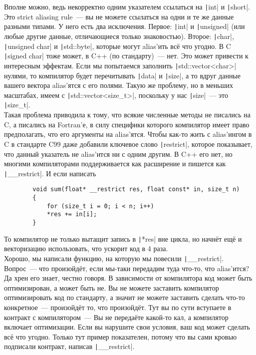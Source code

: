 \documentclass{article}
\begin{document}
    Вполне можно, ведь некорректно одним указателем ссылаться на \texttt|int| и \texttt|short|. Это strict aliasing rule~--- вы не можете ссылаться на одни и те же данные разными типами. У него есть два исключения. Первое: \texttt|int| и \texttt|unsigned| (или любые другие данные, отличающиеся только знаковостью). Второе: \texttt|char|, \texttt|unsigned char| и \texttt|std::byte|, которые могут alias'ить всё что угодно. В C \texttt|signed char| тоже может, в C++ (по стандарту)~--- нет. Это может привести к интересным эффектам. Если мы попытаемся заполнить \texttt|std::vector<char>| нулями, то компилятор будет перечитывать \texttt|data| и \texttt|size|, а то вдруг данные вашего вектора alias'ятся с его полями. Такую же проблему, но в меньших масштабах, имеем с \texttt|std::vector<size_t>|, поскольку у нас \texttt|size|~--- это \texttt|size_t|.\\
    Такая проблема приводила к тому, что всякие численные методы не писались на C, а писались на Fortran'е, в силу специфики которого компилятор имеет право предполагать, что его аргументы на alias'ятся. Чтобы как-то жить с alias'ингом в C в стандарте C99 даже добавили ключевое слово \texttt|restrict|, которое показывает, что данный указатель не alias'ится ни с одним другим. В C++ его нет, но многими компиляторами поддерживается как расширение и пишется как \texttt|__restrict|. И если написать
    \begin{verbatim}
        void sum(float* __restrict res, float const* in, size_t n)
        {
            for (size_t i = 0; i < n; i++)
            *res += in[i];
        }
    \end{verbatim}
    То компилятор не только вытащит запись в \texttt|*res| вне цикла, но начнёт ещё и векторизацию использовать, что ускорит код в 4 раза.\\
    Хорошо, мы написали функцию, на которую мы повесили \texttt|__restrict|. Вопрос~--- что произойдёт, если мы-таки передадим туда что-то, что alias'ится? Да хрен его знает, честно говоря. В зависимости от компилятора код может быть оптимизирован, а может быть не. Вы не можете заставить компилятор оптимизировать код по стандарту, а значит не можете заставить сделать что-то конкретное~--- произойдёт то, что произойдёт. Тут вы по сути вступаете в контракт с компилятором~--- Вы не передаёте какой-то кал, а компилятор включает оптимизации. Если вы нарушите свои условия, ваш код может сделать всё что угодно. Только тут пример показателен, потому что вы сами кровью подписали контракт, написав \texttt|__restrict|.
\end{document}
